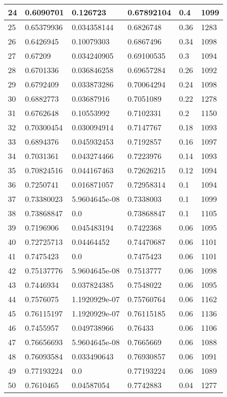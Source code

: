 \begin{longtable}{|l|l|l|l|l|l|}
24 & 0.6090701 & 0.126723 & 0.67892104 & 0.4 & 1099 \\ \hline 
25 & 0.65379936 & 0.034358144 & 0.6826748 & 0.36 & 1283 \\ \hline 
26 & 0.6426945 & 0.10079303 & 0.6867496 & 0.34 & 1098 \\ \hline 
27 & 0.67209 & 0.034240905 & 0.69100535 & 0.3 & 1094 \\ \hline 
28 & 0.6701336 & 0.036846258 & 0.69657284 & 0.26 & 1092 \\ \hline 
29 & 0.6792409 & 0.033873286 & 0.70064294 & 0.24 & 1098 \\ \hline 
30 & 0.6882773 & 0.03687916 & 0.7051089 & 0.22 & 1278 \\ \hline 
31 & 0.6762648 & 0.10553992 & 0.7102331 & 0.2 & 1150 \\ \hline 
32 & 0.70300454 & 0.030094914 & 0.7147767 & 0.18 & 1093 \\ \hline 
33 & 0.6894376 & 0.045932453 & 0.7192857 & 0.16 & 1097 \\ \hline 
34 & 0.7031361 & 0.043274466 & 0.7223976 & 0.14 & 1093 \\ \hline 
35 & 0.70824516 & 0.044167463 & 0.72626215 & 0.12 & 1094 \\ \hline 
36 & 0.7250741 & 0.016871057 & 0.72958314 & 0.1 & 1094 \\ \hline 
37 & 0.73380023 & 5.9604645e-08 & 0.7338003 & 0.1 & 1099 \\ \hline 
38 & 0.73868847 & 0.0 & 0.73868847 & 0.1 & 1105 \\ \hline 
39 & 0.7196906 & 0.045483194 & 0.7422368 & 0.06 & 1095 \\ \hline 
40 & 0.72725713 & 0.04464452 & 0.74470687 & 0.06 & 1101 \\ \hline 
41 & 0.7475423 & 0.0 & 0.7475423 & 0.06 & 1101 \\ \hline 
42 & 0.75137776 & 5.9604645e-08 & 0.7513777 & 0.06 & 1098 \\ \hline 
43 & 0.7446934 & 0.037824385 & 0.7548022 & 0.06 & 1095 \\ \hline 
44 & 0.7576075 & 1.1920929e-07 & 0.75760764 & 0.06 & 1162 \\ \hline 
45 & 0.76115197 & 1.1920929e-07 & 0.76115185 & 0.06 & 1136 \\ \hline 
46 & 0.7455957 & 0.049738966 & 0.76433 & 0.06 & 1106 \\ \hline 
47 & 0.76656693 & 5.9604645e-08 & 0.7665669 & 0.06 & 1088 \\ \hline 
48 & 0.76093584 & 0.033490643 & 0.76930857 & 0.06 & 1091 \\ \hline 
49 & 0.77193224 & 0.0 & 0.77193224 & 0.06 & 1089 \\ \hline 
50 & 0.7610465 & 0.04587054 & 0.7742883 & 0.04 & 1277 \\ \hline 
\end{longtable}
